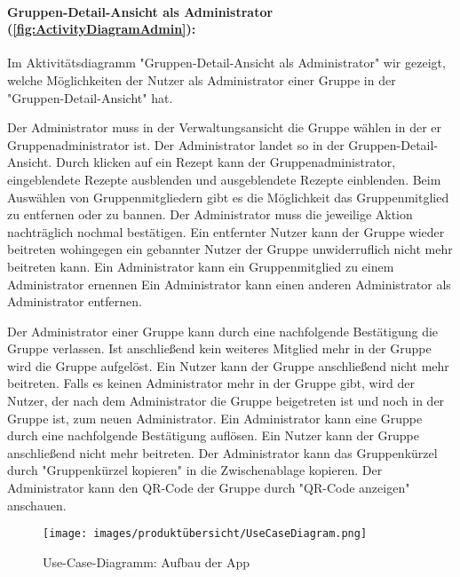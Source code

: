 \documentclass[parskip=full]{scrartcl}
\begin{document}
\paragraph{Gruppen-Detail-Ansicht als Administrator (\autoref{fig:ActivityDiagramAdmin}):}

Im Aktivitätsdiagramm "Gruppen-Detail-Ansicht als Administrator" wir gezeigt, welche Möglichkeiten der Nutzer als Administrator einer Gruppe in der "Gruppen-Detail-Ansicht" hat.

Der Administrator muss in der Verwaltungsansicht die Gruppe wählen in der er Gruppenadministrator ist.
Der Administrator landet so in der Gruppen-Detail-Ansicht.
Durch klicken auf ein Rezept kann der Gruppenadministrator, eingeblendete Rezepte ausblenden und ausgeblendete Rezepte einblenden.\newline
Beim Auswählen von Gruppenmitgliedern gibt es die Möglichkeit das Gruppenmitglied zu entfernen oder zu bannen.
Der Administrator muss die jeweilige Aktion nachträglich nochmal bestätigen.
Ein entfernter Nutzer kann der Gruppe wieder beitreten wohingegen ein gebannter Nutzer der Gruppe unwiderruflich nicht mehr beitreten kann.
Ein Administrator kann ein Gruppenmitglied zu einem Administrator ernennen
Ein Administrator kann einen anderen Administrator als Administrator entfernen.

Der Administrator einer Gruppe kann durch eine nachfolgende Bestätigung die Gruppe verlassen.
Ist anschließend kein weiteres Mitglied mehr in der Gruppe wird die Gruppe aufgelöst. Ein Nutzer kann der Gruppe anschließend nicht mehr beitreten.
Falls es keinen Administrator mehr in der Gruppe gibt, wird der Nutzer, der nach dem Administrator die Gruppe beigetreten ist und noch in der Gruppe ist, zum neuen Administrator.
Ein Administrator kann eine Gruppe durch eine nachfolgende Bestätigung auflösen. Ein Nutzer kann der Gruppe anschließend nicht mehr beitreten.\newline
Der Administrator kann das Gruppenkürzel durch "Gruppenkürzel kopieren" in die Zwischenablage kopieren. Der Administrator kann den QR-Code der Gruppe durch "QR-Code anzeigen" anschauen.

\newpage

\begin{figure}[!htp]
    \centering
    \begin{adjustbox}{right=160mm}
        \texttt{[image: images/produktübersicht/UseCaseDiagram.png]}
    \end{adjustbox}
    \caption{Use-Case-Diagramm: Aufbau der App}
    \label{fig:UseCaseDiagram}
\end{figure}
\newpage
\end{document}
